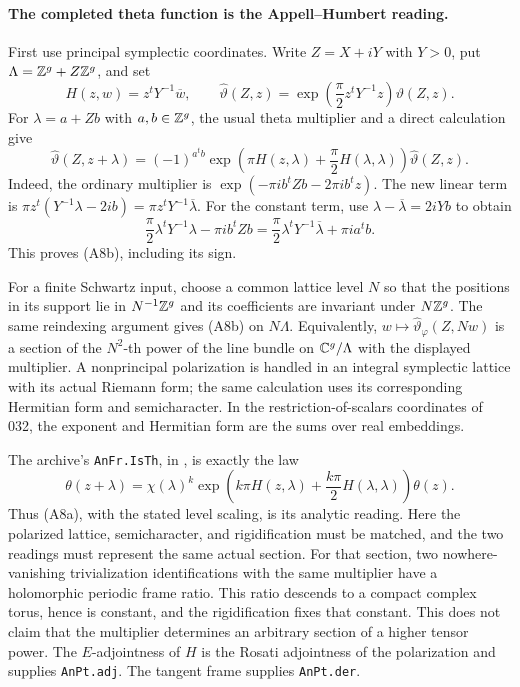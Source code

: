 \documentclass[11pt]{article}
\theoremstyle{definition}\newtheorem{definition}[theorem]{Definition}\newtheorem{remark}[theorem]{Remark}
\begin{document}
\paragraph{The completed theta function is the Appell--Humbert reading.}
First use principal symplectic coordinates.  Write $Z=X+iY$ with
$Y>0$, put $\Lambda=\mathbb Z^g+Z\mathbb Z^g$, and set
\[
 H(z,w)=z^tY^{-1}\overline w,\qquad
 \widehat\vartheta(Z,z)
       =\exp\left(\frac\pi2z^tY^{-1}z\right)\vartheta(Z,z).
 \tag{A8a}
\]
For $\lambda=a+Zb$ with $a,b\in\mathbb Z^g$, the usual theta multiplier
and a direct calculation give
\[
 \widehat\vartheta(Z,z+\lambda)
  =(-1)^{a^tb}
    \exp\left(\pi H(z,\lambda)+\frac\pi2H(\lambda,\lambda)\right)
       \widehat\vartheta(Z,z).
 \tag{A8b}
\]
Indeed, the ordinary multiplier is
$\exp(-\pi i b^tZb-2\pi i b^tz)$.  The new linear term is
$\pi z^t(Y^{-1}\lambda-2ib)=\pi z^tY^{-1}\overline\lambda$.
For the constant term, use
$\lambda-\overline\lambda=2iYb$ to obtain
\[
 \frac\pi2\lambda^tY^{-1}\lambda-\pi i b^tZb
  =\frac\pi2\lambda^tY^{-1}\overline\lambda+\pi i a^tb.
\]
This proves (A8b), including its sign.

For a finite Schwartz input, choose a common lattice level $N$ so
that the positions in its support lie in $N^{-1}\mathbb Z^g$ and its
coefficients are invariant under $N\mathbb Z^g$.  The same reindexing
argument gives (A8b) on $N\Lambda$.  Equivalently,
$w\mapsto\widehat\vartheta_\varphi(Z,Nw)$ is a section of the
$N^2$-th power of the line bundle on $\mathbb C^g/\Lambda$ with the
displayed multiplier.  A nonprincipal polarization is handled in
an integral symplectic lattice with its actual Riemann form; the
same calculation uses its corresponding Hermitian form and
semicharacter.  In the restriction-of-scalars coordinates of 032,
the exponent and Hermitian form are the sums over real embeddings.

The archive's \texttt{AnFr.IsTh}, in
, is exactly the law
\[
 \theta(z+\lambda)
   =\chi(\lambda)^k
       \exp\left(k\pi H(z,\lambda)
                +\frac{k\pi}{2}H(\lambda,\lambda)\right)\theta(z).
\]
Thus (A8a), with the stated level scaling, is its analytic reading.
Here the polarized lattice, semicharacter, and rigidification must
be matched, and the two readings must represent the same actual
section.  For that section, two nowhere-vanishing trivialization
identifications with the same multiplier have a holomorphic
periodic frame ratio.  This ratio descends to a compact complex
torus, hence is constant, and the rigidification fixes that
constant.  This does not claim that the multiplier determines an
arbitrary section of a higher tensor power.  The $E$-adjointness of
$H$ is the Rosati adjointness of
the polarization and supplies \texttt{AnPt.adj}.  The tangent
frame supplies \texttt{AnPt.der}.
\end{document}
